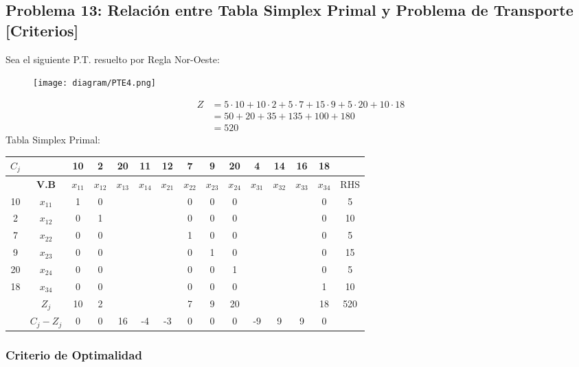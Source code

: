 \documentclass{templateNote}
\begin{document}
\subsection*{Problema 13: Relación entre Tabla Simplex Primal y Problema de Transporte [Criterios]}
Sea el siguiente P.T. resuelto por Regla Nor-Oeste:
\begin{figure}[H]
    \centering
    \texttt{[image: diagram/PTE4.png]}
\end{figure}
\begin{align*}
    Z &= 5 \cdot 10 + 10 \cdot 2 + 5 \cdot 7 + 15 \cdot 9 + 5 \cdot 20 + 10 \cdot 18\\
    &= 50 + 20 + 35 + 135 + 100 + 180 \\
    &= 520
\end{align*}
Tabla Simplex Primal:
\begin{center}
    \begin{tabular}{|c|c|c|c|c|c|c|c|c|c|c|c|c|c|c|}
        \hline
        $C_j$ & & 10 & 2 & 20 & 11 & 12 & 7 & 9 & 20 & 4 & 14 & 16 & 18 & \\ \hline
        & \textbf{V.B} & $x_{11}$ & $x_{12}$ & $x_{13}$ & $x_{14}$ & $x_{21}$ & $x_{22}$ & $x_{23}$ & $x_{24}$ & $x_{31}$ & $x_{32}$ & $x_{33}$ & $x_{34}$ & RHS \\ \hline
        10 & $x_{11}$ & 1 & 0 & & & & 0 & 0 & 0 & & & & 0 & 5 \\ \hline
        2 & $x_{12}$ & 0 & 1 & & & & 0 & 0 & 0 & & & & 0 & 10 \\ \hline
        7 & $x_{22}$ & 0 & 0 & & & & 1 & 0 & 0 & & & & 0 & 5 \\ \hline
        9 & $x_{23}$ & 0 & 0 & & & & 0 & 1 & 0 & & & & 0 & 15 \\ \hline
        20 & $x_{24}$ & 0 & 0 & & & & 0 & 0 & 1 & & & & 0 & 5 \\ \hline
        18 & $x_{34}$ & 0 & 0 & & & & 0 & 0 & 0 & & & & 1 & 10 \\ \hline
        & $Z_j$ & 10 & 2 & & & & 7 & 9 & 20 & & & & 18 & 520 \\ \hline
        & $C_j - Z_j$ & 0 & 0 & \textcolor{morado}{16} & \textcolor{morado}{-4} & \textcolor{morado}{-3} & 0 & 0 & 0 & \textcolor{morado}{-9} & \textcolor{morado}{9}& \textcolor{morado}{9} & 0 & \\ \hline
    \end{tabular}
\end{center}

\subsubsection*{Criterio de Optimalidad}
\end{document}
